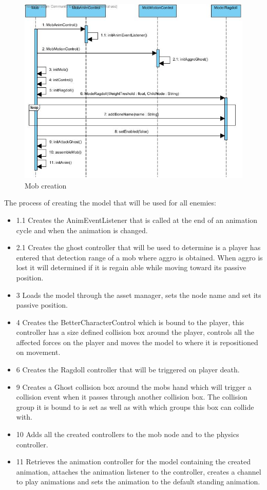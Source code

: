 \documentclass[letterpaper]{article}
\begin{document}
					\begin{figure}[H]
					\centering
					\includegraphics[width=160mm, height=90mm]{UML_Diagram/Sequence/Mob_Creation.jpg}
					\caption{Mob creation}
					\label{overflow}
					\end{figure}
					
					The process of creating the model that will be used for all enemies:
					\begin{itemize}
						\item 1.1 Creates the AnimEventListener that is called at the end of an animation cycle and when the animation is changed.
						\item 2.1 Creates the ghost controller that will be used to determine is a player has entered that detection range of a mob where aggro is obtained. When aggro is lost it will determined if it is regain able while moving toward its passive position.
						\item 3 Loads the model through the asset manager, sets the node name and set its passive position.
						\item 4 Creates the BetterCharacterControl which is bound to the player, this controller has a size defined collision box around the player, controls all the affected forces on the player and moves the model to where it is repositioned on movement.
						\item 6 Creates the Ragdoll controller that will be triggered on player death.
						\item 9 Creates a Ghost collision box around the mobs hand which will trigger a collision event when it passes through another collision box. The collision group it is bound to is set as well as with which groups this box can collide with.
						\item 10 Adds all the created controllers to the mob node and to the physics controller.
						\item 11 Retrieves the animation controller for the model containing the created animation, attaches the animation listener to the controller, creates a channel to play animations and sets the animation to the default standing animation.
					\end{itemize}
					
\end{document}

